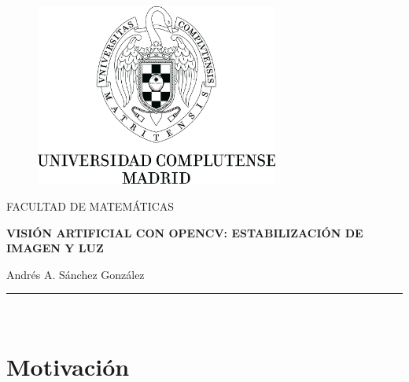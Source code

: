 \documentclass[a4paper,openright, 12pt]{book}
\begin{document}
\begin{titlepage}


\begin{center}
\vspace*{-1in}
\begin{figure}[htb]
\begin{center}
\includegraphics[width=8cm]{logo}
\end{center}
\end{figure}

FACULTAD DE MATEMÁTICAS\\
\vspace*{0.7in}

\begin{Large}
\textbf{VISIÓN ARTIFICIAL CON OPENCV: ESTABILIZACIÓN DE IMAGEN Y LUZ} \\
\end{Large}
\vspace*{0.5in}
\begin{large}
Andrés A. Sánchez González\\
\end{large}
\vspace*{0.3in}
\rule{80mm}{0.1mm}\\
\vspace*{0.1in}

\end{center}

\end{titlepage}

\newpage
\mbox{}
\thispagestyle{empty} 


\tableofcontents %
\newpage
\thispagestyle{empty}


\chapter*{Motivación}\label{cap.introduccion}
%
\end{document}
